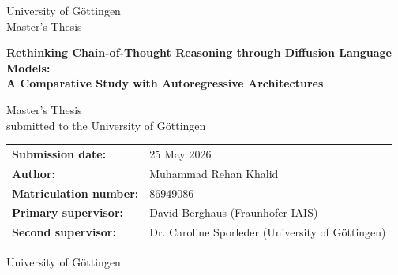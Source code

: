 \begin{titlepage}
\thispagestyle{empty}
\begin{center}
\vspace*{1.0cm}
{\Large University of G\"ottingen}\\[0.3cm]
{\large Master's Thesis}\\[2.0cm]

{\bfseries\Large Rethinking Chain-of-Thought Reasoning through Diffusion Language Models:\\[0.25cm] A Comparative Study with Autoregressive Architectures\par}

\vspace{1.5cm}
{\large Master's Thesis}\\[0.2cm]
{\large submitted to the University of G\"ottingen}\\[2.0cm]

\begin{tabular}{ll}
\textbf{Submission date:} & 25 May 2026 \\
\textbf{Author:} & Muhammad Rehan Khalid \\
\textbf{Matriculation number:} & 86949086 \\
\textbf{Primary supervisor:} & David Berghaus (Fraunhofer IAIS) \\
\textbf{Second supervisor:} & Dr. Caroline Sporleder (University of G\"ottingen) \\
\end{tabular}

\vfill
{\large University of G\"ottingen}
\end{center}
\end{titlepage}
